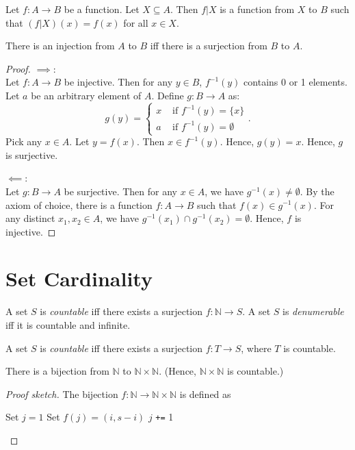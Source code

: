 \documentclass[a4paper, 12pt, fleqn]{article}
\begin{document}
\begin{definition}[Restriction]
Let $f: A \to B$ be a function. Let $X \subseteq A$. Then $f|X$ is a function from $X$ to $B$
such that $(f|X)(x) = f(x)$ for all $x \in X$.
\end{definition}

\begin{lemma}
There is an injection from $A$ to $B$ iff there is a surjection from $B$ to $A$.
\end{lemma}
\begin{proof}
$\implies$:
\\ Let $f: A \to B$ be injective.
Then for any $y \in B$, $f^{-1}(y)$ contains 0 or 1 elements.
Let $a$ be an arbitrary element of $A$. Define $g: B \to A$ as:
\[ g(y) = \begin{cases}x & \textrm{ if } f^{-1}(y) = \{x\}
\\ a & \textrm{ if } f^{-1}(y) = \emptyset \end{cases}. \]
Pick any $x \in A$. Let $y = f(x)$. Then $x \in f^{-1}(y)$. Hence, $g(y) = x$.
Hence, $g$ is surjective.

$\impliedby$:
\\ Let $g: B \to A$ be surjective.
Then for any $x \in A$, we have $g^{-1}(x) \neq \emptyset$.
By the axiom of choice, there is a function $f: A \to B$ such that $f(x) \in g^{-1}(x)$.
For any distinct $x_1, x_2 \in A$, we have $g^{-1}(x_1) \cap g^{-1}(x_2) = \emptyset$.
Hence, $f$ is injective.
\end{proof}

\section{Set Cardinality}

\begin{definition}
A set $S$ is \emph{countable} iff there exists a surjection $f: \mathbb{N} \to S$.
A set $S$ is \emph{denumerable} iff it is countable and infinite.
\end{definition}

\begin{lemma}
A set $S$ is \emph{countable} iff there exists a surjection $f: T \to S$, where $T$ is countable.
\end{lemma}

\begin{lemma}
There is a bijection from $\mathbb{N}$ to $\mathbb{N} \times \mathbb{N}$.
(Hence, $\mathbb{N} \times \mathbb{N}$ is countable.)
\end{lemma}
\begin{proof}[Proof sketch]
The bijection $f: \mathbb{N} \to \mathbb{N} \times \mathbb{N}$ is defined as
\begin{algorithmic}[1]
\State Set $j = 1$
        \State Set $f(j) = (i, s-i)$
        \State $j$ \texttt{+=} 1
    \EndFor
\EndFor
\end{algorithmic}
\end{proof}
\end{document}
